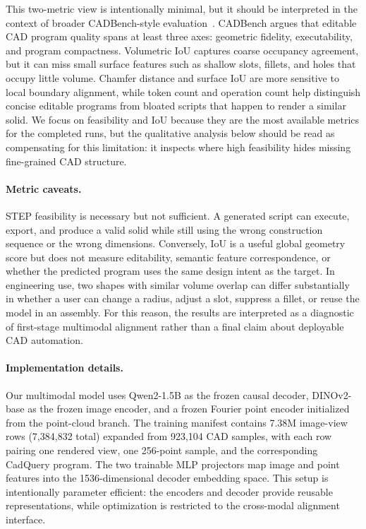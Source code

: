 \documentclass{article}
\begin{document}
This two-metric view is intentionally minimal, but it should be interpreted in the context of broader CADBench-style evaluation~\cite{cadbench}. CADBench argues that editable CAD program quality spans at least three axes: geometric fidelity, executability, and program compactness. Volumetric IoU captures coarse occupancy agreement, but it can miss small surface features such as shallow slots, fillets, and holes that occupy little volume. Chamfer distance and surface IoU are more sensitive to local boundary alignment, while token count and operation count help distinguish concise editable programs from bloated scripts that happen to render a similar solid. We focus on feasibility and IoU because they are the most available metrics for the completed runs, but the qualitative analysis below should be read as compensating for this limitation: it inspects where high feasibility hides missing fine-grained CAD structure.

\paragraph{Metric caveats.}
STEP feasibility is necessary but not sufficient. A generated script can execute, export, and produce a valid solid while still using the wrong construction sequence or the wrong dimensions. Conversely, IoU is a useful global geometry score but does not measure editability, semantic feature correspondence, or whether the predicted program uses the same design intent as the target. In engineering use, two shapes with similar volume overlap can differ substantially in whether a user can change a radius, adjust a slot, suppress a fillet, or reuse the model in an assembly. For this reason, the results are interpreted as a diagnostic of first-stage multimodal alignment rather than a final claim about deployable CAD automation.

\paragraph{Implementation details.}
Our multimodal model uses Qwen2-1.5B as the frozen causal decoder, DINOv2-base as the frozen image encoder, and a frozen Fourier point encoder initialized from the point-cloud branch. The training manifest contains 7.38M image-view rows (7{,}384{,}832 total) expanded from 923{,}104 CAD samples, with each row pairing one rendered view, one 256-point sample, and the corresponding CadQuery program. The two trainable MLP projectors map image and point features into the 1536-dimensional decoder embedding space. This setup is intentionally parameter efficient: the encoders and decoder provide reusable representations, while optimization is restricted to the cross-modal alignment interface.
\end{document}
